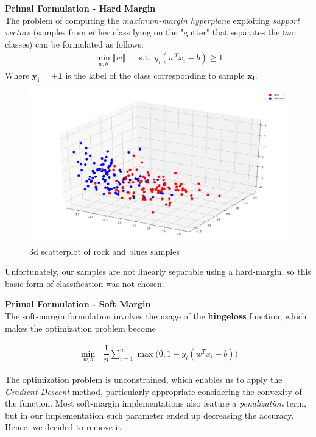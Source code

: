 \documentclass[12pt]{article}
\begin{document}
	\textbf{Primal Formulation - Hard Margin}\\
	The problem of computing the \textit{maximum-margin hyperplane} exploiting \textit{support vectors} (samples from either class lying on the "gutter" that separates the two classes) can be formulated as follows:\\
	\begin{align}
		\min_{w,b} \Vert w \Vert &&
		\text{s.t.}\ \ y_i(w^Tx_i-b)\ge 1
	\end{align} 
	Where $\mathbf{y_i =\pm 1}$ is the label of the class corresponding to sample $\mathbf{x_i}$.\\
	
	\begin{figure}[H]
		\hspace{120pt}\includegraphics[scale=0.2]{exp1_legend}
		\caption{3d scatterplot of rock and blues samples}
	\end{figure}
	
	Unfortunately, our samples are not linearly separable using a hard-margin, so this basic form of classification was not chosen.\newpage
	
	\textbf{Primal Formulation - Soft Margin}\\
	The soft-margin formulation involves the usage of the \textbf{hingeloss} function, which makes the optimization problem become
	
	\begin{align}
		\min_{w,b}\ \ \ \dfrac {1}{n} \sum_{i=1}^n{\max{\Big(0,1-y_i(w^Tx_i-b)\Big)}}
	\end{align}

	The optimization problem is unconstrained, which enables us to apply the \textit{Gradient Descent} method, particularly appropriate considering the convexity of the function. Most soft-margin implementations also feature a \textit{penalization} term, but in our implementation such parameter ended up decreasing the accuracy. Hence, we decided to remove it.
	
\end{document}
